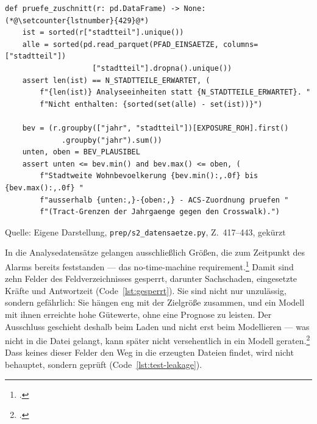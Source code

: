 \documentclass[12pt,a4paper]{article}
\newcommand{\tabquelle}[1][Eigene Darstellung]{%
  \par\setlength{\parskip}{0pt}\vspace{3pt}%
  {\setstretch{1}\fontsize{9pt}{11pt}\selectfont\raggedright Quelle: #1\par}%
}
\begin{document}
\begin{quellcode}[htbp]
\caption{Prüfung von Zuschnitt und Wohnbevölkerung}
\label{lst:zuschnitt}\vspace{-3.5pt}
\begin{lstlisting}[style=pythonstil,firstnumber=417]
def pruefe_zuschnitt(r: pd.DataFrame) -> None:(*@\setcounter{lstnumber}{429}@*)
    ist = sorted(r["stadtteil"].unique())
    alle = sorted(pd.read_parquet(PFAD_EINSAETZE, columns=["stadtteil"])
                    ["stadtteil"].dropna().unique())
    assert len(ist) == N_STADTTEILE_ERWARTET, (
        f"{len(ist)} Analyseeinheiten statt {N_STADTTEILE_ERWARTET}. "
        f"Nicht enthalten: {sorted(set(alle) - set(ist))}")

    bev = (r.groupby(["jahr", "stadtteil"])[EXPOSURE_ROH].first()
             .groupby("jahr").sum())
    unten, oben = BEV_PLAUSIBEL
    assert unten <= bev.min() and bev.max() <= oben, (
        f"Stadtweite Wohnbevoelkerung {bev.min():,.0f} bis {bev.max():,.0f} "
        f"ausserhalb {unten:,}-{oben:,} - ACS-Zuordnung pruefen "
        f"(Tract-Grenzen der Jahrgaenge gegen den Crosswalk).")
\end{lstlisting}
\tabquelle[Eigene Darstellung, \texttt{prep/s2\_datensaetze.py}, Z.~417--443, gekürzt]
\end{quellcode}
 
In die Analysedatensätze gelangen ausschließlich Größen, die zum Zeitpunkt des
Alarms bereits feststanden --- das no-time-machine
requirement.\footcite[559]{Kaufman2011} Damit sind zehn Felder des
Feldverzeichnisses gesperrt, darunter Sachschaden, eingesetzte Kräfte und
Antwortzeit (Code~\ref{lst:gesperrt}). Sie sind nicht nur unzulässig,
sondern gefährlich: Sie hängen eng mit der Zielgröße zusammen, und ein Modell
mit ihnen erreichte hohe Gütewerte, ohne eine Prognose zu leisten. Der
Ausschluss geschieht deshalb beim Laden und nicht erst beim Modellieren ---
was nicht in die Datei gelangt, kann später nicht versehentlich in ein Modell
geraten.\footcite[560]{Kaufman2011} Dass keines dieser Felder den Weg in die
erzeugten Dateien findet, wird nicht behauptet, sondern geprüft
(Code~\ref{lst:test-leakage}).
 
\end{document}
